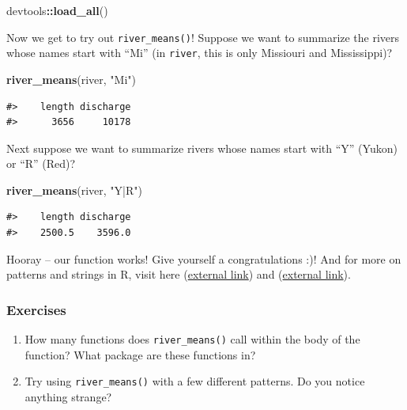 \documentclass[
]{book}
\newenvironment{Shaded}{\begin{snugshade}}{\end{snugshade}}
\newcommand{\KeywordTok}[1]{\textcolor[rgb]{0.13,0.29,0.53}{\textbf{#1}}}
\newcommand{\NormalTok}[1]{#1}
\newcommand{\OperatorTok}[1]{\textcolor[rgb]{0.81,0.36,0.00}{\textbf{#1}}}
\newcommand{\StringTok}[1]{\textcolor[rgb]{0.31,0.60,0.02}{#1}}
\begin{document}
\begin{Shaded}
\begin{Highlighting}[]
\NormalTok{devtools}\OperatorTok{::}\KeywordTok{load_all}\NormalTok{()}
\end{Highlighting}
\end{Shaded}

Now we get to try out \texttt{river\_means()}! Suppose we want to summarize the rivers whose names start with ``Mi'' (in \texttt{river}, this is only Missiouri and Mississippi)?

\begin{Shaded}
\begin{Highlighting}[]
\KeywordTok{river_means}\NormalTok{(river, }\StringTok{"Mi"}\NormalTok{)}
\end{Highlighting}
\end{Shaded}

\begin{verbatim}
#>    length discharge 
#>      3656     10178
\end{verbatim}

Next suppose we want to summarize rivers whose names start with ``Y'' (Yukon) or ``R'' (Red)?

\begin{Shaded}
\begin{Highlighting}[]
\KeywordTok{river_means}\NormalTok{(river, }\StringTok{"Y|R"}\NormalTok{)}
\end{Highlighting}
\end{Shaded}

\begin{verbatim}
#>    length discharge 
#>    2500.5    3596.0
\end{verbatim}

Hooray -- our function works! Give yourself a congratulations :)! And for more on patterns and strings in R, visit here (\href{https://r4ds.had.co.nz/strings.html}{external link}) and (\href{https://bookdown.org/rdpeng/rprogdatascience/regular-expressions.html\#sub-and-gsub}{external link}).

\hypertarget{ex-set2}{%
\subsubsection{Exercises}\label{ex-set2}}

\begin{enumerate}
\def\labelenumi{\arabic{enumi}.}
\item
  How many functions does \texttt{river\_means()} call within the body of the function? What package are these functions in?
\item
  Try using \texttt{river\_means()} with a few different patterns. Do you notice anything strange?
\end{enumerate}
\end{document}
